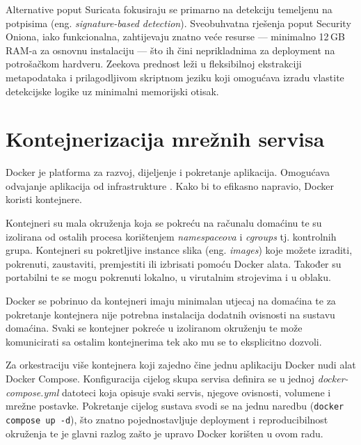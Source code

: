 Alternative poput Suricata fokusiraju se primarno na detekciju temeljenu na potpisima (eng. \textit{signature-based detection}). Sveobuhvatna rješenja poput 
Security Oniona, iako funkcionalna, zahtijevaju znatno veće resurse — minimalno 12\,GB RAM-a za osnovnu instalaciju \cite{security_onion}\cite{security_onion_hwreq} — što ih čini 
neprikladnima za deployment na potrošačkom hardveru. Zeekova prednost leži u fleksibilnoj ekstrakciji metapodataka i prilagodljivom skriptnom jeziku koji 
omogućava izradu vlastite detekcijske logike uz minimalni memorijski otisak.

\section{Kontejnerizacija mrežnih servisa}
Docker je platforma za razvoj, dijeljenje i pokretanje aplikacija. Omogućava odvajanje aplikacija od infrastrukture \cite{docker_docs}. Kako bi to efikasno napravio, Docker koristi kontejnere.

Kontejneri su mala okruženja koja se pokreću na računalu domaćinu te su izolirana od ostalih procesa korištenjem \textit{namespaceova} i \textit{cgroups} tj. kontrolnih grupa. Kontejneri su 
pokretljive instance slika (eng. \textit{images}) koje možete izraditi, pokrenuti, zaustaviti, premjestiti ili izbrisati pomoću Docker alata. Također su portabilni te se mogu pokrenuti lokalno,
u virutalnim strojevima i u oblaku. 

Docker se pobrinuo da kontejneri imaju minimalan utjecaj na domaćina te za pokretanje kontejnera nije potrebna instalacija dodatnih ovisnosti na sustavu domaćina. Svaki se kontejner pokreće u 
izoliranom okruženju te može komunicirati sa ostalim kontejnerima tek ako mu se to eksplicitno dozvoli.

Za orkestraciju više kontejnera koji zajedno čine jednu aplikaciju Docker nudi alat Docker Compose. Konfiguracija cijelog skupa servisa definira se u jednoj 
\textit{docker-compose.yml} datoteci koja opisuje svaki servis, njegove ovisnosti, volumene i mrežne postavke. Pokretanje cijelog sustava svodi se na jednu naredbu 
(\lstinline|docker compose up -d|), što znatno pojednostavljuje deployment i reproducibilnost okruženja te je glavni razlog zašto je upravo Docker korišten u ovom radu.

